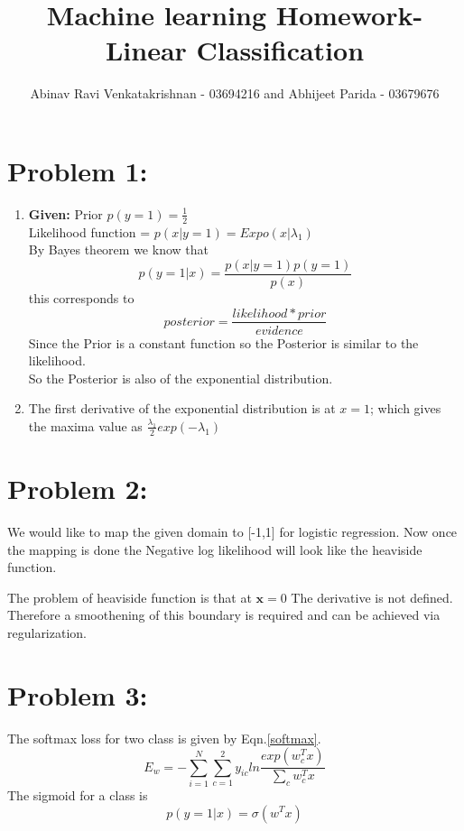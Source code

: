 \documentclass[5pt,a4paper]{article}
\begin{document}
	\title{Machine learning Homework- Linear Classification}
	\author{Abinav Ravi Venkatakrishnan - 03694216 and Abhijeet Parida - 03679676}
	\maketitle
	\section*{Problem 1:}
	\begin{enumerate}
	
	\item \textbf{Given:} Prior $p(y=1) = \frac{1}{2}$\\
	Likelihood function = $p(x|y=1) = Expo(x|\lambda_1)$\\
	By Bayes theorem we know that\\
	\begin{equation}
		p(y = 1|x) = \frac{p(x|y = 1)p(y=1)}{p(x)}
	\end{equation}
	this corresponds to\\
	\begin{equation}
	posterior = \frac{likelihood * prior}{evidence}
	\end{equation}
	Since the Prior is a constant function so the Posterior is similar to the likelihood.\\
	So the Posterior is also of the exponential distribution.
	\item The first derivative of the exponential distribution is at $x=1$; which gives the maxima value as $\frac{\lambda_1}{2} exp(-\lambda_1)$
\end{enumerate} 
	\section*{Problem 2:}
	We would like to map the given domain to [-1,1] for logistic regression. Now once the mapping is done the Negative log likelihood will look like the heaviside function.
	
	The problem of heaviside function is that at $\textbf{x}=0$ The derivative is not defined. Therefore a smoothening of this boundary is required and can be achieved via regularization.
	\section*{Problem 3:}
	The softmax loss for two class is given by Eqn.\ref{softmax}.
	\begin{equation}
	E_w=-\sum_{i=1}^{N}\sum_{c=1}^{2} y_{ic} ln\frac{exp(w_c^Tx)}{\sum_{c}^{}w_c^Tx}
	\label{softmax}
	\end{equation}
	The sigmoid for a class is
	\begin{equation}
		p(y=1|x)=\sigma (w^Tx)
	\end{equation}
	
\end{document}
